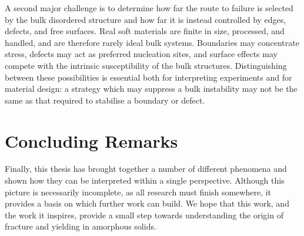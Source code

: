 \documentclass[asymmetricmargins]{library/duthesis}%
\providecommand{\DIFaddbegin}{} %
\providecommand{\DIFaddend}{} %
\begin{document}
A second major challenge is to determine how far the route to failure is selected by the bulk disordered structure and how far it is instead controlled by edges, defects, and free surfaces. Real soft materials are finite in size, processed, and handled, and are therefore rarely ideal bulk systems. Boundaries may concentrate stress, defects may act as preferred nucleation sites, and surface effects may compete with the intrinsic susceptibility of the bulk structures. Distinguishing between these possibilities is essential both for interpreting experiments and for material design: a strategy which may suppress a bulk instability may not be the same as that required to stabilise a boundary or defect.

\section{Concluding Remarks}
Finally, this thesis has brought together a number of different phenomena and shown how they can be interpreted within a single perspective. Although this picture is necessarily incomplete, as all research must finish somewhere, it provides a basis on which further work can build. We hope that this work, and the work it inspires, provide a small step towards understanding the origin of fracture and yielding in amorphous solids.
 \newpage 
 \newpage %
\begin{singlespace}
    \printbibliography[heading=bibintoc]
\end{singlespace} \newpage                             %
\DIFaddbegin \appendix                                           %
\DIFaddend %
\end{document}
